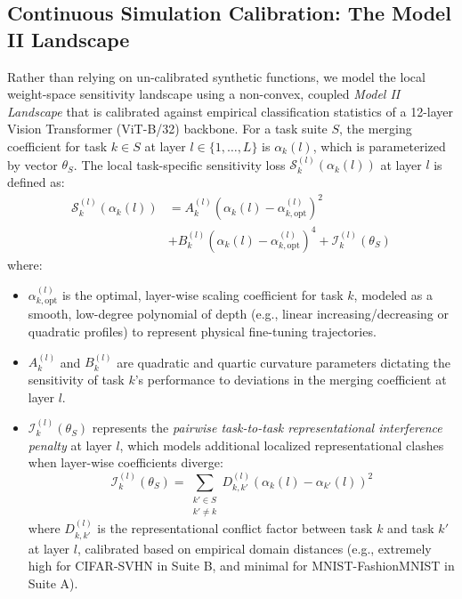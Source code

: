 \subsection{Continuous Simulation Calibration: The Model II Landscape}
Rather than relying on un-calibrated synthetic functions, we model the local weight-space sensitivity landscape using a non-convex, coupled \emph{Model II Landscape} that is calibrated against empirical classification statistics of a 12-layer Vision Transformer (ViT-B/32) backbone.
For a task suite $S$, the merging coefficient for task $k \in S$ at layer $l \in \{1, \dots, L\}$ is $\alpha_k(l)$, which is parameterized by vector $\theta_S$.
The local task-specific sensitivity loss $\mathcal{S}_k^{(l)}(\alpha_k(l))$ at layer $l$ is defined as:
\begin{equation}
\label{eq:sensitivity}
\begin{aligned}
\mathcal{S}_k^{(l)}(\alpha_k(l)) &= A_k^{(l)} \left(\alpha_k(l) - \alpha_{k, \text{opt}}^{(l)}\right)^2 \\
&+ B_k^{(l)} \left(\alpha_k(l) - \alpha_{k, \text{opt}}^{(l)}\right)^4 + \mathcal{I}_k^{(l)}(\theta_S)
\end{aligned}
\end{equation}
where:
\begin{itemize}
    \item $\alpha_{k, \text{opt}}^{(l)}$ is the optimal, layer-wise scaling coefficient for task $k$, modeled as a smooth, low-degree polynomial of depth (e.g., linear increasing/decreasing or quadratic profiles) to represent physical fine-tuning trajectories.
    \item $A_k^{(l)}$ and $B_k^{(l)}$ are quadratic and quartic curvature parameters dictating the sensitivity of task $k$'s performance to deviations in the merging coefficient at layer $l$.
    \item $\mathcal{I}_k^{(l)}(\theta_S)$ represents the \emph{pairwise task-to-task representational interference penalty} at layer $l$, which models additional localized representational clashes when layer-wise coefficients diverge:
    \begin{equation}
    \label{eq:interference}
    \mathcal{I}_k^{(l)}(\theta_S) = \sum_{\substack{k' \in S \\ k' \neq k}} D_{k, k'}^{(l)} \left(\alpha_k(l) - \alpha_{k'}(l)\right)^2
    \end{equation}
    where $D_{k, k'}^{(l)}$ is the representational conflict factor between task $k$ and task $k'$ at layer $l$, calibrated based on empirical domain distances (e.g., extremely high for CIFAR-SVHN in Suite B, and minimal for MNIST-FashionMNIST in Suite A).
\end{itemize}

